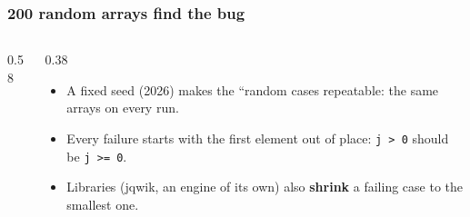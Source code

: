\documentclass[aspectratio=169,10pt,compress]{beamer}
\begin{document}
\begin{frame}[t,fragile] \frametitle{200 random arrays find the bug}
  \begin{columns}[T]
    \begin{column}{0.58\textwidth}
    \end{column}
    \begin{column}{0.38\textwidth}
      \begin{itemize}\small
        \item A fixed seed (2026) makes the ``random cases repeatable: the same arrays on every run.
        \item Every failure starts with the first element out of place: \texttt{j > 0} should be \texttt{j >= 0}.
        \item Libraries (jqwik, an engine of its own) also \textbf{shrink} a failing case to the smallest one.
      \end{itemize}
    \end{column}
  \end{columns}
\end{frame}

\end{document}
